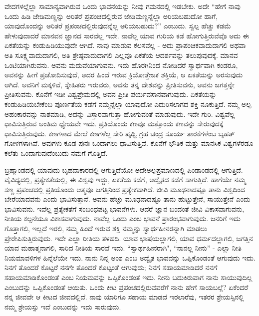 ವೇದಗಳಲ್ಲೆಲ್ಲಾ ಸಾಮಾನ್ಯವಾಗಿರುವ ಒಂದು ಭಾವನೆಯನ್ನು ನೀವು ಗಮನದಲ್ಲಿ ಇಡಬೇಕು. ಅದೇ “ಹೇಗೆ ನಾವು ಒಂದು ಹಿಡಿ ಜೇಡಿಮಣ್ಣನ್ನು ಅರಿತರೆ ಪ್ರಪಂಚದಲ್ಲಿರುವ ಜೇಡಿಮಣ್ಣನ್ನೆಲ್ಲಾ ಅರಿಯಬಹುದೋ ಹಾಗೆ, ಯಾವುದೊಂದನ್ನು ಅರಿತರೆ ಪ್ರಪಂಚದಲ್ಲಿರುವುದನ್ನೆಲ್ಲ ಅರಿಯಬಹುದು?” ಎಂಬುದು. ಸ್ವಲ್ಪ ಹೆಚ್ಚು ಕಡಮೆ ಹೇಳುವುದಾದರೆ ಮಾನವನ ಜ್ಞಾನದ ಸಾರವೆಲ್ಲ ಇದೇ. ನಾವೆಲ್ಲ ಯಾವ ಗುರಿಯ ಕಡೆ ಹೋಗುತ್ತಿರುವೆವೊ ಅದು ಈ ಏಕತೆಯನ್ನು ಕಂಡುಹಿಡಿಯುವುದೇ ಆಗಿದೆ. ನಾವು ಮಾಡುವ ಕೆಲಸವೆಲ್ಲ - ಅದು ಪ್ರಾಪಂಚಿಕವಾದುದಾಗಲಿ ಅಥವಾ ಅತಿ ಸೂಕ್ಷ್ಮವಾದುದಾಗಲಿ, ಅತಿ ಶ್ರೇಷ್ಠವಾದುದಾಗಲಿ ಎಲ್ಲವೂ ಏಕತೆಯ ಆದರ್ಶವನ್ನು ತಲುಪುವುದಕ್ಕೆ. ಮಾನವ ಒಂಟಿಯಾಗಿರುವನು. ಅವನು ಮದುವೆಯಾಗುವನು. ಇದು ಹೊರಗಿನಿಂದ ನೋಡಿದರೆ ಸ್ವಾರ್ಥವಾಗಿ ಕಂಡರೂ, ಅವನನ್ನು ಹೀಗೆ ಪ್ರಚೋದಿಸುವುದೆ, ಅದರ ಹಿಂದೆ ಇರುವ ಕ್ರಿಯೋತ್ತೇಜಕ ಶಕ್ತಿಯೆ, ಆ ಏಕತೆಯನ್ನು ಅರಸುವುದು ಆಗಿದೆ. ಅವನಿಗೆ ಮಕ್ಕಳಿವೆ, ಸ್ನೇಹಿತರು ಇರುವರು, ಅವನು ತನ್ನ ದೇಶವನ್ನು ಪ್ರೀತಿಸುವನು, ಅವನು ಜಗತ್ತನ್ನೇ ಪ್ರೀತಿಸುವನು. ಕೊನೆಗೆ ಇಡೀ ವಿಶ್ವಪ್ರೇಮದಲ್ಲಿ ಅವನ ಪ್ರೀತಿ ಪರ್ಯವಸಾನವಾಗುವುದು. ಏಕತೆಯನ್ನು ಕಂಡುಹಿಡಿಯಬೇಕೆಂಬ ಪೂರ್ಣತೆಯ ಕಡೆಗೆ ನಮ್ಮನ್ನೆಲ್ಲಾ ಯಾವುದೋ ಎದುರಿಸಲಾಗದ ಶಕ್ತಿ ನೂಕುತ್ತಿದೆ. ನಮ್ಮ ಅಲ್ಪ ಅಹಂಕಾರವನ್ನು ನಾಶಮಾಡಿ, ಅದನ್ನು ವಿಸ್ತಾರವಾಗುತ್ತಾ ಹೋಗುವಂತೆ ಮಾಡುವುದು. ಇದೇ ಗುರಿ. ವಿಶ್ವವೆಲ್ಲ ಧಾವಿಸುತ್ತಿರುವ ಅಂತಿಮ ಧ್ಯೇಯವೇ ಇದು. ಪ್ರತಿಯೊಂದು ಕಣವೂ ಮತ್ತೊಂದು ಕಣವನ್ನು ಸೇರುವುದಕ್ಕೆ ಧಾವಿಸುತ್ತಿರುವುದು. ಕಣಗಳಾದ ಮೇಲೆ ಕಣಗಳೆಲ್ಲ ಸೇರಿ ಪೃಥ್ವಿ ಗ್ರಹ ಚಂದ್ರ ಸೂರ್ಯ ತಾರಕೆಗಳೆಂಬ ಬೃಹತ್ ಗೋಳಗಳಾಗಿವೆ. ಅವುಗಳು ಕೂಡ ಪುನಃ ಒಂದಾಗಲು ಧಾವಿಸುತ್ತಿವೆ. ಕೊನೆಗೆ ಭೌತಿಕ ಮತ್ತು ಮಾನಸಿಕ ವಿಶ್ವಗಳೆರಡೂ ಕಲೆತು ಒಂದಾಗುವುದೆಂಬುದು ನಮಗೆ ಗೊತ್ತಿದೆ.

ಬ್ರಹ್ಮಾಂಡದಲ್ಲಿ ಯಾವುದು ಬೃಹದಾಕಾರದಲ್ಲಿ ಆಗುತ್ತಿದೆಯೋ ಅದೇ\break ಅಲ್ಪಪ್ರಮಾಣದಲ್ಲಿ ಪಿಂಡಾಂಡದಲ್ಲಿ ಆಗುತ್ತಿದೆ. ವೈವಿಧ್ಯದಲ್ಲಿ, ಪ್ರತ್ಯೇಕತೆಯಲ್ಲಿ, ಈ ವಿಶ್ವವು ಇದ್ದು, ಏಕತೆಯ ಕಡೆಗೆ, ಅದ್ವೈತದ ಕಡೆಗೆ ಸಾಗುತ್ತಿದೆ. ಹಾಗೆಯೇ ನಮ್ಮ ಸಣ್ಣ ಪ್ರಪಂಚದಲ್ಲಿ ಪ್ರತಿಯೊಂದು ಆತ್ಮವೂ ಜಗತ್ತಿನಿಂದ ಪ್ರತ್ಯೇಕವಾಗಿದೆ. ಜೀವಿ ಮೂಢನಾದಷ್ಟೂ ತಾನು ವಿಶ್ವದಿಂದ ಬೇರೆಯಾದವನು ಎಂದು ಭಾವಿಸುತ್ತಾನೆ. ಅವನು ಹೆಚ್ಚು ಮೂಢನಾದಷ್ಟೂ ತಾನು ಹುಟ್ಟುತ್ತೇನೆ, ಸಾಯುತ್ತೇನೆ ಎಂದು ಭಾವಿಸುವನು. ಇವೆಲ್ಲ ಪ್ರತ್ಯೇಕತೆಗೆ ಸಂಬಂಧಪಟ್ಟ ಭಾವನೆಗಳು. ಆದರೆ ಜ್ಞಾನ ಬಂದಂತೆ ಜೀವಿ ವಿಕಾಸವಾಗುವನು, ನೀತಿಯ ಕಲ್ಪನೆಯೂ ವಿಕಾಸವಾಗುವುದು. ನಾವೆಲ್ಲ ಒಂದು ಎಂಬ ಭಾವನೆ ಪ್ರಾರಂಭವಾಗುವುದು. ಜನರಿಗೆ ಇದು ಗೊತ್ತಾಗಲಿ, ಇಲ್ಲದೆ ಇರಲಿ, ನಮ್ಮ ಹಿಂದೆ ಇರುವ ಶಕ್ತಿ ನಮ್ಮನ್ನು ಸ್ವಾರ್ಥಹೀನರನ್ನಾಗಿ ಮಾಡಲು ಪ್ರೇರೇಪಿಸುತ್ತಿರುವುದು. ಇದೇ ಎಲ್ಲಾ ರೀತಿಯ ತಳಹದಿ. ಯಾವ ಭಾಷೆಯಲ್ಲಾಗಲಿ, ಯಾವ ಧರ್ಮದಲ್ಲಾಗಲಿ, ಜಗತ್ತಿನ ಯಾವ ಮಹಾತ್ಮನಾಗಲಿ, ಸಾರಿದ ನೀತಿಯ ಸಾರವೆ ಇದು. “ಸ್ವಾರ್ಥಹೀನರಾಗಿ", “ನಾನಲ್ಲ ನೀನು'' - ಎಲ್ಲಾ ನೀತಿ ನಿಯಮಾವಳಿಗಳ ಹಿನ್ನೆಲೆಯೇ ಇದು. ನಾನು ನಿನ್ನ ಅಂಶ ಎಂಬ ಅದ್ವೈತ ಭಾವವನ್ನು ಒಪ್ಪಿಕೊಂಡಂತೆ ಆಗುವುದು ಇದು. ನಿನಗೆ ತೊಂದರೆ ಕೊಟ್ಟರೆ ನನಗೇ ತೊಂದರೆ ಕೊಟ್ಟಂತೆ ಆಗುವುದು; ನಿನಗೆ ಸಹಾಯಮಾಡಿದರೆ ನನಗೆ ಸಹಾಯಮಾಡಿಕೊಂಡಂತೆ ಎಂಬ ನಿಯಮವನ್ನು ಒಪ್ಪಿಕೊಂಡಂತೆ ಇದು. ನೀನು ಬದುಕಿರುವಾಗ ನಾನು ಸಾಯುವುದಿಲ್ಲ ಎಂಬುದನ್ನು ಒಪ್ಪಿಕೊಂಡಂತೆ ಆಯಿತು. ಒಂದು ಕೀಟ ಪ್ರಪಂಚದಲ್ಲಿರುವವರೆಗೆ ನಾನು ಹೇಗೆ ಸಾಯಬಲ್ಲೆ? ಏಕೆಂದರೆ ನನ್ನ ಜೀವವೇ ಆ ಕೀಟದ ಜೀವದಲ್ಲಿದೆ. ನಾವು ಯಾರಿಗೂ ಸಹಾಯ ಮಾಡದೆ ಇರಲಾರೆವು, ಇತರರ ಶ್ರೇಯಸ್ಸಿನಲ್ಲಿ ನಮ್ಮ ಶ್ರೇಯಸ್ಸು ಇದೆ ಎಂಬುದನ್ನು ಇದು ಸಾರುವುದು.

